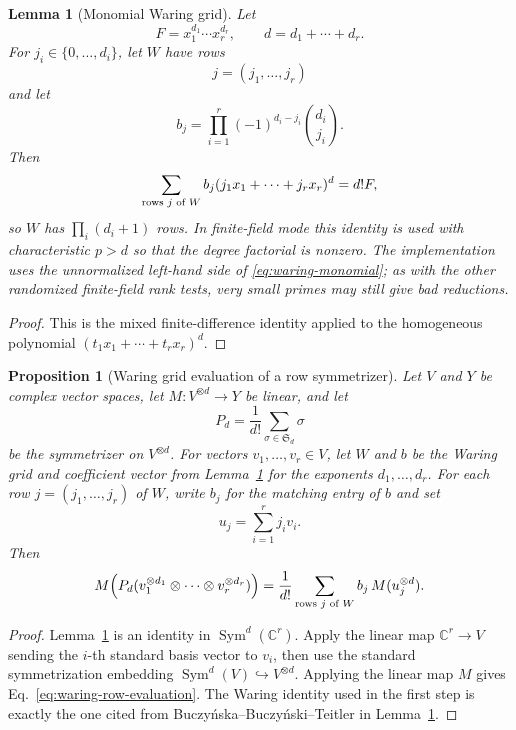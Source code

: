 \documentclass[11pt]{article}
\newcommand{\dsC}{\mathbb{C}}
\newcommand{\Sym}{\operatorname{Sym}}
\newtheorem{proposition}[theorem]{Proposition}
\newtheorem{lemma}[theorem]{Lemma}
\theoremstyle{definition}
\begin{document}
\begin{lemma}[Monomial Waring grid]\label{lem:waring-monomial-matrix}
  Let
  \[
    F=x_1^{d_1}\cdots x_r^{d_r},
    \qquad
    d=d_1+\cdots+d_r.
  \]
  For $j_i\in\{0,\dots,d_i\}$, let $W$ have rows
  \[
    j=(j_1,\dots,j_r)
  \]
  and let
  \[
    b_j=\prod_{i=1}^r (-1)^{d_i-j_i}\binom{d_i}{j_i}.
  \]
  Then
  \begin{equation}\label{eq:waring-monomial}
    \sum_{\textup{rows }j\textup{ of }W}
      b_j(j_1x_1+\cdots+j_rx_r)^d
    =
    d!F,
  \end{equation}
  so $W$ has $\prod_i(d_i+1)$ rows.
  In finite-field mode this identity is used with characteristic $p>d$ so that the degree factorial is nonzero.
  The implementation uses the unnormalized left-hand side of \eqref{eq:waring-monomial}; as with the other randomized finite-field rank tests, very small primes may still give bad reductions.
\end{lemma}
\begin{proof}
  This is the mixed finite-difference identity applied to the homogeneous polynomial $(t_1x_1+\cdots+t_rx_r)^d$.
\end{proof}

\begin{proposition}[Waring grid evaluation of a row symmetrizer]\label{prop:waring-grid-evaluation}
  Let $V$ and $Y$ be complex vector spaces, let $M:V^{\otimes d}\to Y$ be linear, and let
  \[
    P_d=\frac{1}{d!}\sum_{\sigma\in\mathfrak S_d}\sigma
  \]
  be the symmetrizer on $V^{\otimes d}$.
  For vectors $v_1,\dots,v_r\in V$, let $W$ and $b$ be the Waring grid and coefficient vector from Lemma~\ref{lem:waring-monomial-matrix} for the exponents $d_1,\dots,d_r$.
  For each row $j=(j_1,\dots,j_r)$ of $W$, write $b_j$ for the matching entry of $b$ and set
  \[
    u_j=\sum_{i=1}^r j_i v_i.
  \]
  Then
  \begin{equation}\label{eq:waring-row-evaluation}
    M\!\left(P_d(v_1^{\otimes d_1}\otimes\cdots\otimes v_r^{\otimes d_r})\right)
    =
    \frac{1}{d!}
    \sum_{\textup{rows }j\textup{ of }W} b_j\,M(u_j^{\otimes d}).
  \end{equation}
\end{proposition}
\begin{proof}
  Lemma~\ref{lem:waring-monomial-matrix} is an identity in $\Sym^d(\dsC^r)$.
  Apply the linear map $\dsC^r\to V$ sending the $i$-th standard basis vector to $v_i$, then use the standard symmetrization embedding $\Sym^d(V)\hookrightarrow V^{\otimes d}$.
  Applying the linear map $M$ gives Eq.~\eqref{eq:waring-row-evaluation}.
  The Waring identity used in the first step is exactly the one cited from Buczy\'nska--Buczy\'nski--Teitler in Lemma~\ref{lem:waring-monomial-matrix}.
\end{proof}
\end{document}
